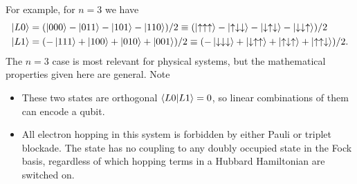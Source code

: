 \documentclass{report}
\begin{document}
\begin{appendices}
For example, for $n = 3$ we have
\begin{align*}
    \ket{L0} &= (\ket{000} - \ket{011} - \ket{101} - \ket{110})/2 \equiv (\ket{\uparrow\uparrow\uparrow} - \ket{\uparrow\downarrow\downarrow} - \ket{\downarrow\uparrow\downarrow} - \ket{\downarrow\downarrow\uparrow})/2\\
    \ket{L1} &= (-\ket{111} + \ket{100} + \ket{010} + \ket{001})/2 \equiv (-\ket{\downarrow\downarrow\downarrow} + \ket{\downarrow\uparrow\uparrow} + \ket{\uparrow\downarrow\uparrow} + \ket{\uparrow\uparrow\downarrow})/2.
\end{align*} The $n=3$ case is most relevant for physical systems, but the mathematical properties given here are general. Note
\begin{itemize}
    \item These two states are orthogonal $\braket{L0|L1} = 0$, so linear combinations of them can encode a qubit.
    \item All electron hopping in this system is forbidden by either Pauli or triplet blockade. The state has no coupling to any doubly occupied state in the Fock basis, regardless of which hopping terms in a Hubbard Hamiltonian are switched on.
\end{itemize}


\end{appendices}
\end{document}
